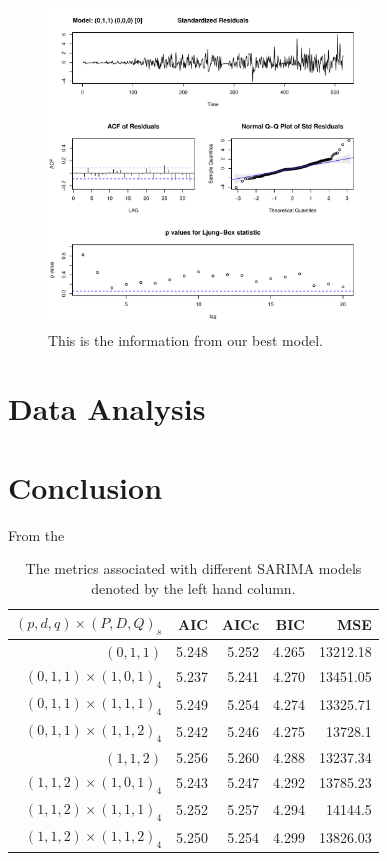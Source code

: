 \documentclass[font=12pt]{paper}
\begin{document}
\begin{figure}[t]
\centering
    \includegraphics[width=0.75\textwidth]{../image/best_model.pdf}
\caption{This is the information from our best model.}
\label{outlier}
\end{figure}


\section{Data Analysis}
\section{Conclusion}

From the 
\begin{table}
\centering
\begin{tabular}{r || r | r| r| r}
$(p, d, q) \times(P, D, Q)_s$   & AIC   &AICc   &BIC    &MSE\\
\hline
$(0, 1, 1)$               & 5.248 &5.252  &4.265  &13212.18\\
$(0, 1, 1) \times (1, 0, 1)_4$   & 5.237 &5.241  &4.270  &13451.05\\ %
$(0, 1, 1) \times (1, 1, 1)_4$   & 5.249 &5.254  &4.274  &13325.71\\
$(0, 1, 1) \times (1, 1, 2)_4$   & 5.242 &5.246  &4.275  &13728.1\\
\hline
$(1, 1, 2)$               & 5.256 & 5.260 &4.288  &13237.34\\
$(1, 1, 2) \times (1, 0, 1)_4$   & 5.243 &5.247  &4.292  &13785.23\\ %
$(1, 1, 2) \times (1, 1, 1)_4$   & 5.252 & 5.257 &4.294  &14144.5\\
$(1, 1, 2)\times (1, 1, 2)_4$   & 5.250 & 5.254 & 4.299 &13826.03
\end{tabular}
\caption{The metrics associated with different SARIMA models denoted by the left hand column.}
\end{table}
\end{document}
